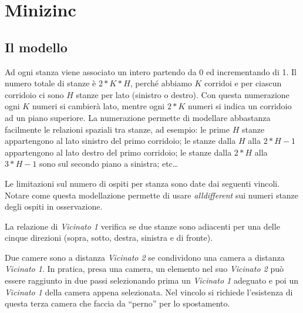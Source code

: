 
\section{Minizinc}
\subsection{Il modello}
Ad ogni stanza viene associato un intero partendo da 0 ed incrementando di 1.
Il numero totale di stanze è $2*K*H$, perché abbiamo $K$ corridoi e per ciascun corridoio ci sono $H$ stanze per lato (sinistro o destro).
Con questa numerazione ogni $K$ numeri si cambierà lato, mentre ogni $2*K$ numeri si indica un corridoio ad un piano superiore.
La numerazione permette di modellare abbastanza facilmente le relazioni spaziali tra stanze,
ad esempio:
le prime $H$ stanze appartengono al lato sinistro del primo corridoio;
le stanze dalla $H$ alla $2*H-1$ appartengono al lato destro del primo corridoio;
le stanze dalla $2*H$ alla $3*H-1$ sono sul secondo piano a sinistra; etc\dots


\noindent
Le limitazioni sul numero di ospiti per stanza sono date dai seguenti vincoli.
Notare come questa modellazione permette di usare \emph{alldifferent} sui numeri stanze degli ospiti in osservazione.


\noindent
La relazione di \emph{Vicinato 1} verifica se due stanze sono adiacenti per una delle cinque direzioni (sopra, sotto, destra, sinistra e di fronte).


\noindent
Due camere sono a distanza \emph{Vicinato 2} se condividono una camera a distanza \emph{Vicinato 1}.
In pratica, presa una camera, un elemento nel suo \emph{Vicinato 2} può essere raggiunto in due passi selezionando prima un \emph{Vicinato 1} adeguato e poi un \emph{Vicinato 1} della camera appena selezionata.
Nel vincolo si richiede l'esistenza di questa terza camera che faccia da ``perno'' per lo spostamento.


